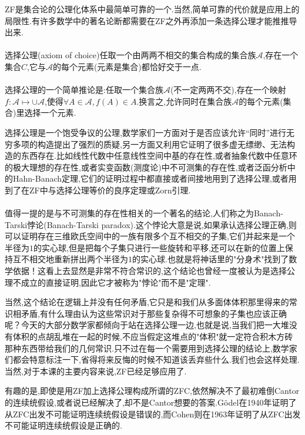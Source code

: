 ZF是集合论的公理化体系中最简单可靠的一个.当然,简单可靠的代价就是应用上的局限性.有许多数学中的著名论断都需要在ZF之外再添加一条选择公理才能推推导出来.
\\ \hspace*{\fill} \\%
选择公理(axiom of choice)任取一个由两两不相交的集合构成的集合族$\mathcal{A}$,存在一个集合$C$,它与$\mathcal{A}$的每个元素(元素是集合)都恰好交于一点.
\\ \hspace*{\fill} \\%
选择公理的一个简单推论是:任取一个集合族$\mathcal{A}$(不一定两两不交),存在一个映射$f:\mathcal{A}\mapsto\cup\mathcal{A}$,使得$\forall A\in\mathcal{A},f(A)\in A$.换言之,允许同时在集合族$\mathcal{A}$的每个元素(集合)里选择一个元素.

选择公理是一个饱受争议的公理,数学家们一方面对于是否应该允许“同时”进行无穷多项的构造提出了强烈的质疑,另一方面又利用它证明了很多虚无缥缈、无法构造的东西存在.比如线性代数中任意线性空间中基的存在性,或者抽象代数中任意环的极大理想的存在性,或者实变函数(测度论)中不可测集的存在性,或者泛函分析中的Hahn-Banach定理,它们的证明过程中都直接或者间接地用到了选择公理,或者用到了在ZF中与选择公理等价的良序定理或Zorn引理.
\\ \hspace*{\fill} \\%
值得一提的是与不可测集的存在性相关的一个著名的结论,人们称之为Banach-Tarski悖论(Banach-Tarski paradox).这个悖论大意是说,如果承认选择公理正确,则可以证明存在三维欧氏空间中的一族有限多个互不相交的子集,它们并起来是一个半径为$1$的实心球,但是把每个子集只进行一些旋转和平移,还可以在新的位置上保持互不相交地重新拼出两个半径为$1$的实心球.也就是将神话里的"分身术"找到了数学依据！这看上去显然是非常不符合常识的,这个结论也曾经一度被认为是选择公理不成立的直接证明,因此它才被称为"悖论"而不是"定理".

当然,这个结论在逻辑上并没有任何矛盾,它只是和我们从多面体体积那里得来的常识相矛盾,有什么理由认为这些常识对于那些复杂得不可想象的子集也应该正确呢？今天的大部分数学家都倾向于站在选择公理一边,也就是说,当我们把一大堆没有体积的点胡乱堆在一起的时候,不应当假定这堆点的"体积"就一定符合积木方砖那种东西带给我们的几何常识.只不过在每一个需要用到选择公理的结论上,数学家们都会特意标注一下,省得将来反悔的时候不知道该丢弃些什么.我们也会这样处理.当然,对于本课的主要内容来说,ZF已经足够应用了.

有趣的是,即使是用ZF加上选择公理构成所谓的ZFC,依然解决不了最初难倒Cantor的连续统假设,或者说已经解决了,却不是Cantor想要的答案.Gödel在1940年证明了从ZFC出发不可能证明连续统假设是错误的,而Cohen则在1963年证明了从ZFC出发不可能证明连续统假设是正确的.	

